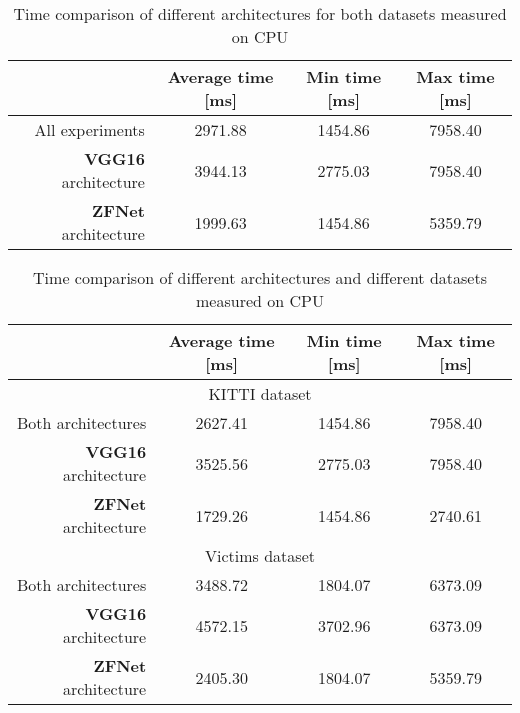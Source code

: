\begin{table}[!h]
\begin{tabular}{r|ccc}
 & Average time [ms] & Min time [ms] & Max time [ms] \\
\hline
All experiments & 2971.88 & 1454.86 & 7958.40 \\
\textbf{VGG16} architecture & 3944.13 & 2775.03 & 7958.40 \\
\textbf{ZFNet} architecture & 1999.63 & 1454.86 & 5359.79
\end{tabular}
\caption{Time comparison of different architectures for both datasets measured on CPU}
\label{timec1}
\end{table}

\begin{table}[!h]
\begin{tabular}{r|ccc}
 & Average time [ms] & Min time [ms] & Max time [ms] \\
\hline
\multicolumn{4}{c}{KITTI dataset} \\ \hline
Both architectures & 2627.41 & 1454.86 & 7958.40 \\
\textbf{VGG16} architecture & 3525.56 & 2775.03 & 7958.40 \\
\textbf{ZFNet} architecture & 1729.26 & 1454.86 & 2740.61 \\
\hline
\multicolumn{4}{c}{Victims dataset} \\ \hline
Both architectures & 3488.72 & 1804.07 & 6373.09 \\
\textbf{VGG16} architecture & 4572.15 & 3702.96 & 6373.09 \\
\textbf{ZFNet} architecture & 2405.30 & 1804.07 & 5359.79 \\
\end{tabular}
\caption{Time comparison of different architectures and different datasets measured on CPU}
\label{timec2}
\end{table}
